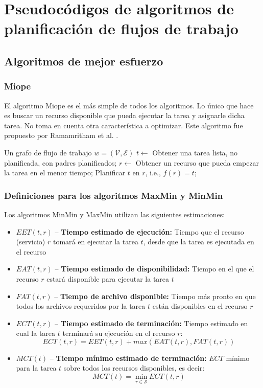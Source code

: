 \chapter[Pseudocódigos]{Pseudocódigos de algoritmos de planificación de flujos de trabajo}

\section{Algoritmos de mejor esfuerzo}

\subsection{Miope}
\label{alg:myopic}
El algoritmo Miope \cite{yu2008workflow} es el más simple de todos los algoritmos. Lo único que hace es buscar un recurso disponible que pueda ejecutar la tarea y asignarle dicha tarea. No toma en cuenta otra característica a optimizar. Este algoritmo fue propuesto por Ramamritham et al. \cite{ramamritham1990efficient}. 


\begin{algorithmic}[1]
\Require Un grafo de flujo de trabajo $w=(\mathcal{V}, \mathcal{E})$
	\State $t \gets$ Obtener una tarea lista, no planificada, con padres planificados;
	\State $r \gets$ Obtener un recurso que pueda empezar la tarea en el menor tiempo;
	\State Planificar $t$ en $r$, i.e., $f(r) = t$;
\EndWhile
\end{algorithmic}

\subsection{Definiciones para los algoritmos MaxMin y MinMin}
\label{alg:def_maxmin}
Los algoritmos MinMin y MaxMin utilizan las siguientes estimaciones: %
\begin{itemize}
\item{$EET(t,r)$ -- \textbf{Tiempo estimado de ejecución:} Tiempo que el recurso (servicio) $r$ tomará en ejecutar la tarea $t$, desde que la tarea es ejecutada en el recurso}
\item{$EAT(t,r)$ -- \textbf{Tiempo estimado de disponibilidad:} Tiempo en el que el recurso $r$ estará disponible para ejecutar la tarea $t$}
\item{$FAT(t,r)$ -- \textbf{Tiempo de archivo disponible:} Tiempo más pronto en que todos los archivos requeridos por la tarea $t$ están disponibles en el recurso $r$}
\item{$ECT(t,r)$ -- \textbf{Tiempo estimado de terminación:} Tiempo estimado en cual la tarea $t$ terminará su ejecución en el recurso $r$: 
              \[ ECT(t,r) = EET(t,r) + max(EAT(t,r), FAT(t,r)) \]}
\item{$MCT(t)$ -- \textbf{Tiempo mínimo estimado de terminación: } $ECT$ mínimo para la tarea $t$ sobre todos los recursos disponibles, es decir: 
            \[ MCT(t) = \min_{r \in \mathcal{S}} ECT(t,r) \]}
\end{itemize}

